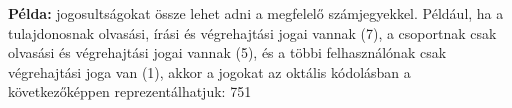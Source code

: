 \documentclass[11pt,a4paper]{article}
\begin{document}
\begin{tcolorbox}[colback=blue!5!white,colframe=blue!50!black,title= 36. Ismertesse a UNIX file-elérési jogok oktális kódolását!]
                                        \textbf{Példa:} jogosultságokat össze lehet adni a megfelelő számjegyekkel. Például, ha a tulajdonosnak olvasási, írási és végrehajtási jogai vannak (7), a csoportnak csak olvasási és végrehajtási jogai vannak (5), és a többi felhasználónak csak végrehajtási joga van (1), akkor a jogokat az oktális kódolásban a következőképpen reprezentálhatjuk: 751\\
                                        \begin{center}
                                        \end{center}
            \end{tcolorbox}
                                    
\end{document}

